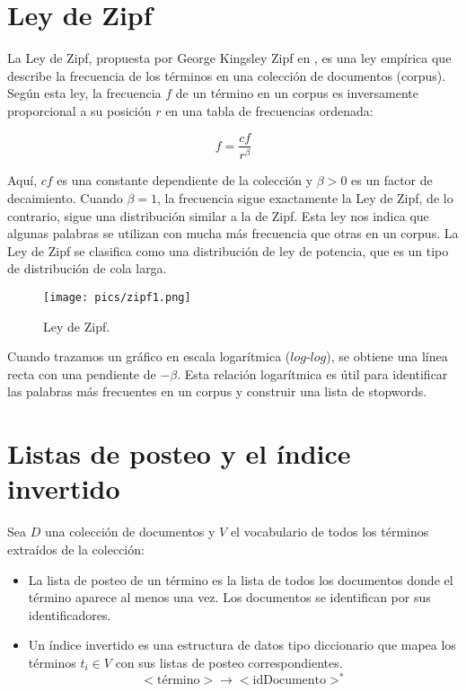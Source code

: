 \section{Ley de Zipf}
La Ley de Zipf, propuesta por George Kingsley Zipf en \cite{zipf1935}, es una ley empírica que describe la frecuencia de los términos en una colección de documentos (corpus). Según esta ley, la frecuencia $f$ de un término en un corpus es inversamente proporcional a su posición $r$ en una tabla de frecuencias ordenada:

\begin{equation}
f = \frac{cf}{r^{\beta}}
\end{equation}

Aquí, $cf$ es una constante dependiente de la colección y $\beta > 0$ es un factor de decaimiento. Cuando $\beta = 1$, la frecuencia sigue exactamente la Ley de Zipf, de lo contrario, sigue una distribución similar a la de Zipf. Esta ley nos indica que algunas palabras se utilizan con mucha más frecuencia que otras en un corpus. La Ley de Zipf se clasifica como una distribución de ley de potencia, que es un tipo de distribución de cola larga.

\begin{figure}[h!]
\centering
\texttt{[image: pics/zipf1.png]}
\caption{Ley de Zipf.}
\end{figure}

Cuando trazamos un gráfico en escala logarítmica ($log$-$log$), se obtiene una línea recta con una pendiente de $-\beta$. Esta relación logarítmica es útil para identificar las palabras más frecuentes en un corpus y construir una lista de stopwords.


\section{Listas de posteo y el índice invertido}
Sea $D$ una colección de documentos y $V$ el vocabulario de todos los términos extraídos de la colección:

\begin{itemize}
\item La lista de posteo de un término es la lista de todos los documentos donde el término aparece al menos una vez. Los documentos se identifican por sus identificadores.
\item Un índice invertido es una estructura de datos tipo diccionario que mapea los términos $t_{i} \in V$ con sus listas de posteo correspondientes.
\begin{displaymath}
<\text{término}> \rightarrow <\text{idDocumento}>^*
\end{displaymath}
\end{itemize}

